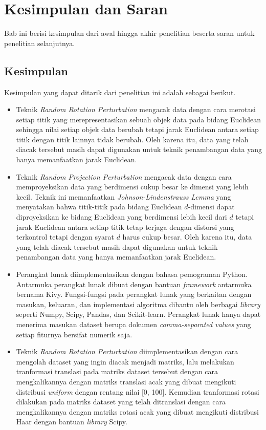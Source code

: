 \chapter{Kesimpulan dan Saran}
\label{chap:kesimpulan-saran}

Bab ini berisi kesimpulan dari awal hingga akhir penelitian beserta saran untuk penelitian selanjutnya.

\section{Kesimpulan}
\label{sec:kesimpulan}

Kesimpulan yang dapat ditarik dari penelitian ini adalah sebagai berikut.
\begin{itemize}
    \item Teknik \textit{Random Rotation Perturbation} mengacak data dengan cara merotasi setiap titik yang merepresentasikan sebuah objek data pada bidang Euclidean sehingga nilai setiap objek data berubah tetapi jarak Euclidean antara setiap titik dengan titik lainnya tidak berubah. Oleh karena itu, data yang telah diacak tersebut masih dapat digunakan untuk teknik penambangan data yang hanya memanfaatkan jarak Euclidean.
    \item Teknik \textit{Random Projection Perturbation} mengacak data dengan cara memproyeksikan data yang berdimensi cukup besar ke dimensi yang lebih kecil. Teknik ini memanfaatkan \textit{Johnson-Lindenstrauss Lemma} yang menyatakan bahwa titik-titik pada bidang Euclidean \(d\)-dimensi dapat diproyeksikan ke bidang Euclidean yang berdimensi lebih kecil dari \(d\) tetapi jarak Euclidean antara setiap titik tetap terjaga dengan distorsi yang terkontrol tetapi dengan syarat \(d\) harus cukup besar. Oleh karena itu, data yang telah diacak tersebut masih dapat digunakan untuk teknik penambangan data yang hanya memanfaatkan jarak Euclidean.
    \item Perangkat lunak diimplementasikan dengan bahasa pemograman Python. Antarmuka perangkat lunak dibuat dengan bantuan \textit{framework} antarmuka bernama Kivy. Fungsi-fungsi pada perangkat lunak yang berkaitan dengan masukan, keluaran, dan implementasi algoritma dibantu oleh berbagai \textit{library} seperti Numpy, Scipy, Pandas, dan Scikit-learn. Perangkat lunak hanya dapat menerima masukan dataset berupa dokumen \textit{comma-separated values} yang setiap fiturnya bersifat numerik saja.
    \item Teknik \textit{Random Rotation Perturbation} diimplementasikan dengan cara mengolah dataset yang ingin diacak menjadi matriks, lalu melakukan tranformasi translasi pada matriks dataset tersebut dengan cara mengkalikannya dengan matriks translasi acak yang dibuat mengikuti distribusi \textit{uniform} dengan rentang nilai [0, 100]. Kemudian tranformasi rotasi dilakukan pada matriks dataset yang telah ditranslasi dengan cara mengkalikannya dengan matriks rotasi acak yang dibuat mengikuti distribusi Haar dengan bantuan \textit{library} Scipy.

\end{itemize}
